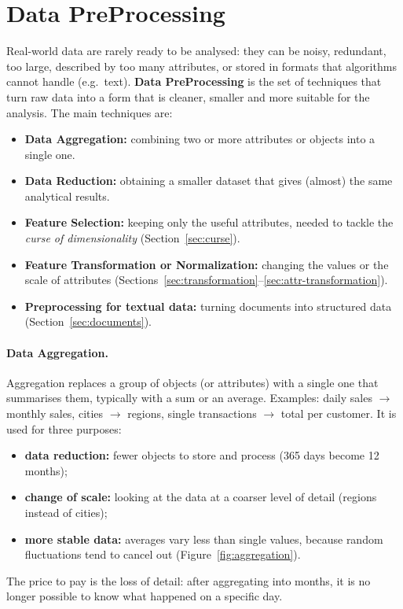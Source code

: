 \section{Data PreProcessing}
Real-world data are rarely ready to be analysed: they can be noisy, redundant, too large, described by too many attributes, or stored in formats that algorithms cannot handle (e.g.\ text). \textbf{Data PreProcessing} is the set of techniques that turn raw data into a form that is cleaner, smaller and more suitable for the analysis. The main techniques are:
\begin{itemize}
    \item \textbf{Data Aggregation:} combining two or more attributes or objects into a single one.
    \item \textbf{Data Reduction:} obtaining a smaller dataset that gives (almost) the same analytical results.
    \item \textbf{Feature Selection:} keeping only the useful attributes, needed to tackle the \emph{curse of dimensionality} (Section~\ref{sec:curse}).
    \item \textbf{Feature Transformation or Normalization:} changing the values or the scale of attributes (Sections~\ref{sec:transformation}--\ref{sec:attr-transformation}).
    \item \textbf{Preprocessing for textual data:} turning documents into structured data (Section~\ref{sec:documents}).
\end{itemize}

\paragraph{Data Aggregation.} Aggregation replaces a group of objects (or attributes) with a single one that summarises them, typically with a sum or an average. Examples: daily sales $\rightarrow$ monthly sales, cities $\rightarrow$ regions, single transactions $\rightarrow$ total per customer. It is used for three purposes:
\begin{itemize}
    \item \textbf{data reduction:} fewer objects to store and process (365 days become 12 months);
    \item \textbf{change of scale:} looking at the data at a coarser level of detail (regions instead of cities);
    \item \textbf{more stable data:} averages vary less than single values, because random fluctuations tend to cancel out (Figure~\ref{fig:aggregation}).
\end{itemize}
The price to pay is the loss of detail: after aggregating into months, it is no longer possible to know what happened on a specific day.


